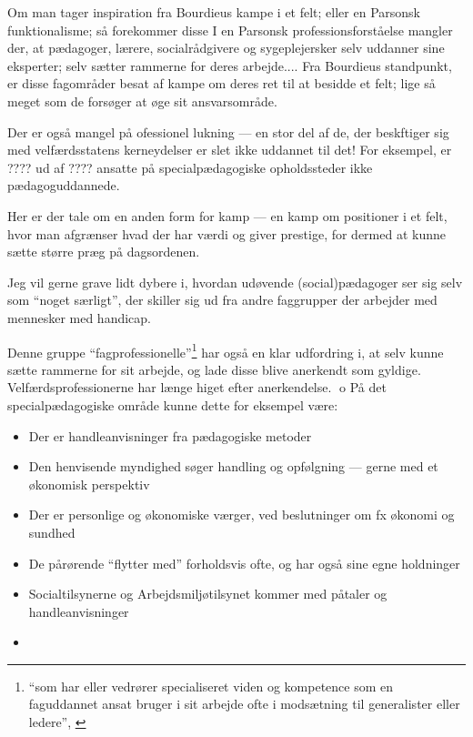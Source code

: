 
Om man tager inspiration fra Bourdieus kampe i et felt; eller en Parsonsk funktionalisme; så forekommer disse 
I en Parsonsk professionsforståelse mangler der, at pædagoger, lærere, socialrådgivere og sygeplejersker selv uddanner sine eksperter; selv sætter rammerne for deres arbejde....
Fra Bourdieus standpunkt, er disse fagområder besat af kampe om deres ret til at besidde et felt; lige så meget som de forsøger at øge sit ansvarsområde.

Der er også mangel på ofessionel lukning — en stor del af de, der beskftiger sig med velfærdsstatens kerneydelser er slet ikke uddannet til det! For eksempel, er ???? ud af ???? ansatte på specialpædagogiske opholdssteder ikke pædagoguddannede.

Her er der tale om en anden form for kamp --- en kamp om positioner i et felt, hvor man afgrænser hvad der har værdi og giver prestige, for dermed at kunne sætte større præg på dagsordenen.

Jeg vil gerne grave lidt dybere i, hvordan udøvende (social)pædagoger ser sig selv som “noget særligt”, der skiller sig ud fra andre faggrupper der arbejder med mennesker med handicap.

Denne gruppe “fagprofessionelle”\footnote{“som har eller vedrører specialiseret viden og kompetence som en faguddannet ansat bruger i sit arbejde ofte i modsætning til generalister eller ledere”, \autocite{FagprofessionelDanskeOrdbog}} har også en klar udfordring i, at selv kunne sætte rammerne for sit arbejde, og lade disse blive anerkendt som gyldige.
Velfærdsprofessionerne har længe higet efter anerkendelse.
o
På det specialpædagogiske område kunne dette for eksempel være:
\begin{itemize}
  \item
    Der er handleanvisninger fra pædagogiske metoder
  \item
    Den henvisende myndighed søger handling og opfølgning — gerne med et økonomisk perspektiv
  \item
    Der er personlige og økonomiske værger, ved beslutninger om fx økonomi og sundhed
  \item
    De pårørende “flytter med” forholdsvis ofte, og har også sine egne holdninger
  \item
    Socialtilsynerne og Arbejdsmiljøtilsynet kommer med påtaler og handleanvisninger
  \item
\end{itemize}


